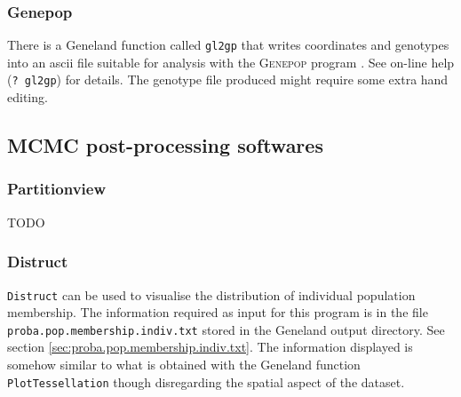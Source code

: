 \documentclass{article}
\begin{document}
\subsubsection{Genepop}
There is a {\sc Geneland} function called \texttt{gl2gp} that writes coordinates and genotypes into an ascii file suitable for analysis 
with the \textsc{Genepop} program \citep{Rousset07}. See on-line help (\texttt{? gl2gp}) for details. 
The genotype file produced might require some extra hand editing.

\subsection{MCMC post-processing  softwares}
\subsubsection{Partitionview}

TODO

\subsubsection{Distruct}
\texttt{Distruct} can be used to visualise the distribution of individual population membership. 
The information required as input for this program is in the file \texttt{proba.pop.membership.indiv.txt} stored in the {\sc Geneland} output directory. 
See section \ref{sec:proba.pop.membership.indiv.txt}. 
The information displayed is somehow similar to what is obtained with the {\sc Geneland} function \texttt{PlotTessellation} 
though disregarding the spatial aspect of the dataset. 




\end{document}
